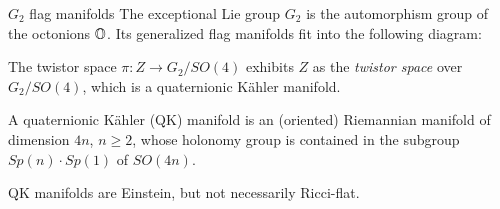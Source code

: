 \documentclass[11pt,parskip]{beamer}
\begin{document}
\begin{frame}[fragile]{$G_2$ flag manifolds}
	The exceptional Lie group $G_2$ is the automorphism group of the octonions $\mathbb{O}$. Its generalized flag manifolds fit into the following diagram: \pause
	\begin{figure}\centering
	\end{figure}
\end{frame}

\begin{frame}{The twistor space}
	$\pi:Z\to G_2/SO(4)$ exhibits $Z$ as the \emph{twistor space} over $G_2/SO(4)$, which is a quaternionic K\"ahler manifold. \pause
	
	\bigskip
	
	\begin{mydef}
		A quaternionic K\"ahler (QK) manifold is an (oriented) Riemannian manifold of dimension $4n$, $n\geq 2$, whose holonomy group is contained in the subgroup $Sp(n)\cdot Sp(1)$ of $SO(4n)$.
	\end{mydef}\pause

	\bigskip

	QK manifolds are Einstein, but not necessarily Ricci-flat. 
\end{frame}
\end{document}
